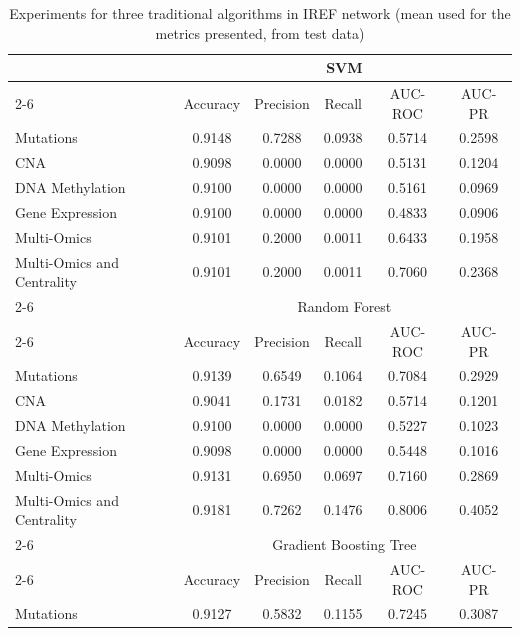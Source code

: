 \documentclass[ppgc, diss, english]{iiufrgs}
\begin{document}
\begin{table}[!th]
\caption{Experiments for three traditional algorithms in IREF network (mean used for the metrics presented, from test data) \label{tab:completa_trad_iref}}
\centering
\begin{tabular}{lccccc}
\hline
                           & \multicolumn{5}{c}{SVM}                          \\ \cline{2-6} 
                           & Accuracy & Precision & Recall & AUC-ROC & AUC-PR \\
Mutations                  & 0.9148   & 0.7288    & 0.0938 & 0.5714  & 0.2598 \\
CNA                        & 0.9098   & 0.0000    & 0.0000 & 0.5131  & 0.1204 \\
DNA Methylation            & 0.9100   & 0.0000    & 0.0000 & 0.5161  & 0.0969 \\
Gene Expression            & 0.9100   & 0.0000    & 0.0000 & 0.4833  & 0.0906 \\
Multi-Omics                & 0.9101   & 0.2000    & 0.0011 & 0.6433  & 0.1958 \\
Multi-Omics and Centrality & 0.9101   & 0.2000    & 0.0011 & 0.7060  & 0.2368 \\ \cline{2-6} 
                           & \multicolumn{5}{c}{Random Forest}                \\ \cline{2-6} 
                           & Accuracy & Precision & Recall & AUC-ROC & AUC-PR \\
Mutations                  & 0.9139   & 0.6549    & 0.1064 & 0.7084  & 0.2929 \\
CNA                        & 0.9041   & 0.1731    & 0.0182 & 0.5714  & 0.1201 \\
DNA Methylation            & 0.9100   & 0.0000    & 0.0000 & 0.5227  & 0.1023 \\
Gene Expression            & 0.9098   & 0.0000    & 0.0000 & 0.5448  & 0.1016 \\
Multi-Omics                & 0.9131   & 0.6950    & 0.0697 & 0.7160  & 0.2869 \\
Multi-Omics and Centrality & 0.9181   & 0.7262    & 0.1476 & 0.8006  & 0.4052 \\ \cline{2-6} 
                           & \multicolumn{5}{c}{Gradient Boosting Tree}            \\ \cline{2-6} 
                           & Accuracy & Precision & Recall & AUC-ROC & AUC-PR \\
Mutations                  & 0.9127   & 0.5832    & 0.1155 & 0.7245  & 0.3087 \\

\end{tabular}
\end{table}
\end{document}
